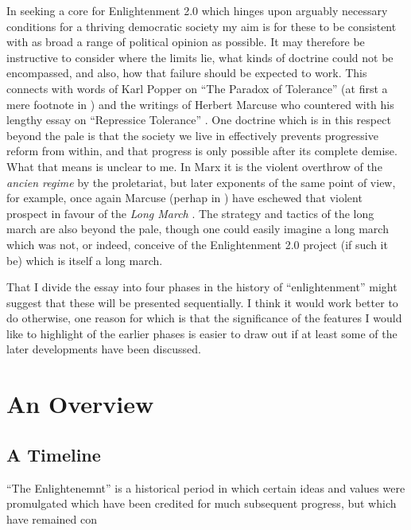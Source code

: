 \documentclass[10pt,titlepage]{book}
\begin{document}
In seeking a core for Enlightenment 2.0 which hinges upon arguably necessary conditions for a thriving democratic society my aim is for these to be consistent with as broad a range of political opinion as possible.
It may therefore be instructive to consider where the limits lie, what kinds of doctrine could not be encompassed, and also, how that failure should be expected to work.
This connects with words of Karl Popper on ``The Paradox of Tolerance'' (at first a mere footnote in \cite{popper-ose}) and the writings of Herbert Marcuse who countered with his lengthy essay on ``Repressice Tolerance'' \cite{marcuse-repressive}.
One doctrine which is in this respect beyond the pale is that the society we live in effectively prevents progressive reform from within, and that progress is only possible after its complete demise.
What that means is unclear to me.
In Marx it is the violent overthrow of the \emph{ancien regime} by the proletariat, but later exponents of the same point of view, for example, once again Marcuse (perhap in \cite{marcuse-liberation}) have eschewed that violent prospect in favour of the \emph{Long March} \cite{sidwell-long}.
The strategy and tactics of the long march are also beyond the pale, though one could easily imagine a long march which was not, or indeed, conceive of the Enlightenment 2.0 project (if such it be) which is itself a long march.


That I divide the essay into four phases in the history of ``enlightenment'' might suggest that these will be presented sequentially.
I think it would work better to do otherwise, one reason for which is that the significance of the features I would like to highlight of the earlier phases is easier to draw out if at least some of the later developments have been discussed.

\section{An Overview}

\subsection{A Timeline}

``The Enlightenemnt'' is a historical period in which certain ideas and values were promulgated which have been credited for much subsequent progress, but which have remained con
\end{document}
